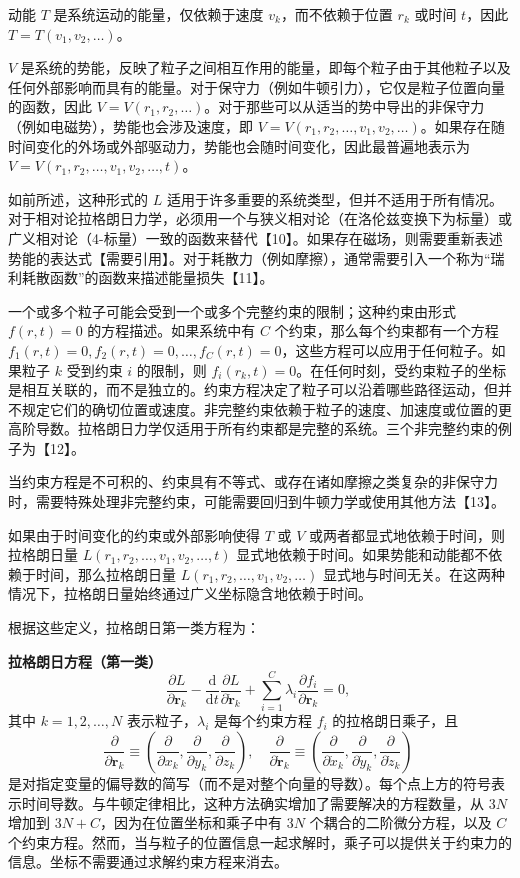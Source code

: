 动能 \( T \) 是系统运动的能量，仅依赖于速度 \( v_k \)，而不依赖于位置 \( r_k \) 或时间 \( t \)，因此 \( T = T(v_1, v_2, \dots) \)。

\( V \) 是系统的势能，反映了粒子之间相互作用的能量，即每个粒子由于其他粒子以及任何外部影响而具有的能量。对于保守力（例如牛顿引力），它仅是粒子位置向量的函数，因此 \( V = V(r_1, r_2, \dots) \)。对于那些可以从适当的势中导出的非保守力（例如电磁势），势能也会涉及速度，即 \( V = V(r_1, r_2, \dots, v_1, v_2, \dots) \)。如果存在随时间变化的外场或外部驱动力，势能也会随时间变化，因此最普遍地表示为 \( V = V(r_1, r_2, \dots, v_1, v_2, \dots, t) \)。

如前所述，这种形式的 \( L \) 适用于许多重要的系统类型，但并不适用于所有情况。对于相对论拉格朗日力学，必须用一个与狭义相对论（在洛伦兹变换下为标量）或广义相对论（4-标量）一致的函数来替代【10】。如果存在磁场，则需要重新表述势能的表达式【需要引用】。对于耗散力（例如摩擦），通常需要引入一个称为“瑞利耗散函数”的函数来描述能量损失【11】。

一个或多个粒子可能会受到一个或多个完整约束的限制；这种约束由形式 \( f(r, t) = 0 \) 的方程描述。如果系统中有 \( C \) 个约束，那么每个约束都有一个方程 \( f_1(r, t) = 0, f_2(r, t) = 0, \dots, f_C(r, t) = 0 \)，这些方程可以应用于任何粒子。如果粒子 \( k \) 受到约束 \( i \) 的限制，则 \( f_i(r_k, t) = 0 \)。在任何时刻，受约束粒子的坐标是相互关联的，而不是独立的。约束方程决定了粒子可以沿着哪些路径运动，但并不规定它们的确切位置或速度。非完整约束依赖于粒子的速度、加速度或位置的更高阶导数。拉格朗日力学仅适用于所有约束都是完整的系统。三个非完整约束的例子为【12】。

当约束方程是不可积的、约束具有不等式、或存在诸如摩擦之类复杂的非保守力时，需要特殊处理非完整约束，可能需要回归到牛顿力学或使用其他方法【13】。

如果由于时间变化的约束或外部影响使得 \( T \) 或 \( V \) 或两者都显式地依赖于时间，则拉格朗日量 \( L(r_1, r_2, \dots, v_1, v_2, \dots, t) \) 显式地依赖于时间。如果势能和动能都不依赖于时间，那么拉格朗日量 \( L(r_1, r_2, \dots, v_1, v_2, \dots) \) 显式地与时间无关。在这两种情况下，拉格朗日量始终通过广义坐标隐含地依赖于时间。

根据这些定义，拉格朗日第一类方程为：

\textbf{拉格朗日方程（第一类）}
\[
\frac{\partial L}{\partial \mathbf{r}_{k}} - \frac{\mathrm{d}}{\mathrm{d}t} \frac{\partial L}{\partial \dot{\mathbf{r}}_{k}} + \sum_{i=1}^{C} \lambda_{i} \frac{\partial f_{i}}{\partial \mathbf{r}_{k}} = 0,~
\]
其中 \( k = 1, 2, \ldots, N \) 表示粒子，\(\lambda_{i}\) 是每个约束方程 \( f_{i} \) 的拉格朗日乘子，且
\[
\frac{\partial }{\partial \mathbf{r}_{k}} \equiv \left(\frac{\partial }{\partial x_{k}}, \frac{\partial }{\partial y_{k}}, \frac{\partial }{\partial z_{k}}\right), \quad \frac{\partial }{\partial \dot{\mathbf{r}}_{k}} \equiv \left(\frac{\partial }{\partial \dot{x}_{k}}, \frac{\partial }{\partial \dot{y}_{k}}, \frac{\partial }{\partial \dot{z}_{k}}\right)~
\]
是对指定变量的偏导数的简写（而不是对整个向量的导数）。每个点上方的符号表示时间导数。与牛顿定律相比，这种方法确实增加了需要解决的方程数量，从 \( 3N \) 增加到 \( 3N + C \)，因为在位置坐标和乘子中有 \( 3N \) 个耦合的二阶微分方程，以及 \( C \) 个约束方程。然而，当与粒子的位置信息一起求解时，乘子可以提供关于约束力的信息。坐标不需要通过求解约束方程来消去。

